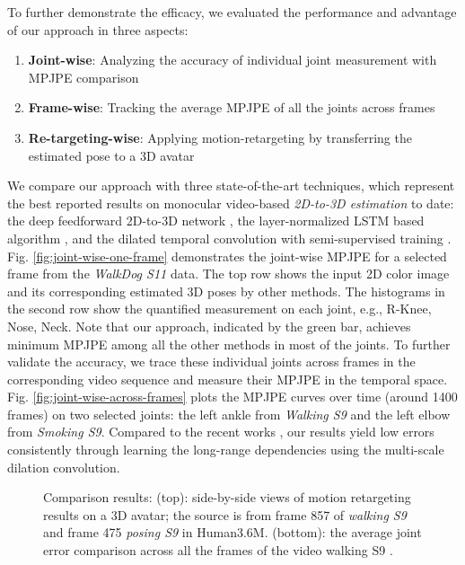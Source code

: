 \documentclass[twocolumn]{svjour3}          \smartqed  \usepackage{graphicx}
\begin{document}
To further demonstrate the efficacy, we evaluated the performance and advantage of our approach in three aspects:
\begin{enumerate}
\item  \textbf{Joint-wise}: Analyzing the accuracy of individual joint measurement with MPJPE comparison 
\item  \textbf{Frame-wise}: Tracking the average MPJPE of all the joints across frames
\item  \textbf{Re-targeting-wise}: Applying motion-retargeting by transferring the estimated pose to a 3D avatar
\end{enumerate}
We compare our approach with three state-of-the-art techniques, which represent the best reported results on monocular video-based \emph{2D-to-3D estimation} to date:  the deep feedforward 2D-to-3D network \citep{Martinez2017}, the layer-normalized LSTM based algorithm \citep{Hossain2018}, and the dilated temporal convolution with semi-supervised training \citep{Pavllo2019}. Fig. \ref{fig:joint-wise-one-frame} demonstrates the joint-wise MPJPE for a selected frame from the \emph{WalkDog S11} data. The top row shows the input 2D color image and its corresponding estimated 3D poses by other methods. The histograms in the second row show the quantified measurement on each joint, e.g., R-Knee, Nose, Neck. Note that our approach, indicated by the green bar, achieves minimum MPJPE among all the other methods in most of the joints. To further validate the accuracy, we trace these individual joints across frames in the corresponding video sequence and measure their MPJPE in the temporal space. Fig. \ref{fig:joint-wise-across-frames} plots the MPJPE curves over time (around 1400 frames) on two selected joints: the left ankle from \emph{Walking S9} and the left elbow from \emph{Smoking S9}. Compared to the recent works \citep{Martinez2017, Hossain2018, Pavllo2019}, our results yield low errors consistently through learning the long-range dependencies using the multi-scale dilation convolution. 

\begin{figure}[ht]
 \label{fig:compare1c}
 \caption{Comparison results: (top): side-by-side views of motion retargeting results on a 3D avatar; the source is from frame 857 of \emph{walking S9} and frame 475 \emph{posing S9} in Human3.6M. (bottom): the average joint error comparison across all the frames of the video walking S9 \citep{Pavllo2019}. }
 \label{fig:compare1}
 \end{figure}
\end{document}
